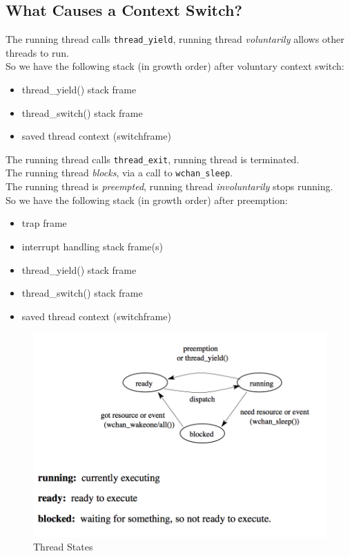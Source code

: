 \documentclass[12pt]{article}
\theoremstyle{plain}
\theoremstyle{definition}
\begin{document}
\subsection{What Causes a Context Switch?}
The running thread calls \texttt{thread\_yield}, running thread \emph{voluntarily} allows other threads to run. \\
So we have the following stack (in growth order) after voluntary context switch:
\begin{itemize}
  \item thread\_yield() stack frame
  \item thread\_switch() stack frame
  \item saved thread context (switchframe)
\end{itemize}

The running thread calls \texttt{thread\_exit}, running thread is terminated. \\

The running thread \emph{blocks}, via a call to \texttt{wchan\_sleep}. \\

The running thread is \emph{preempted}, running thread \emph{involuntarily} stops running. \\
So we have the following stack (in growth order) after preemption:
\begin{itemize}
  \item trap frame
  \item interrupt handling stack frame(s)
  \item thread\_yield() stack frame
  \item thread\_switch() stack frame
  \item saved thread context (switchframe)
\end{itemize}

\begin{figure}[ht]
  \centering
  \includegraphics[scale=0.6]{pictures/thread_states.png}
  \caption{Thread States}
  \label{fig:thread_states}
\end{figure}
\end{document}

